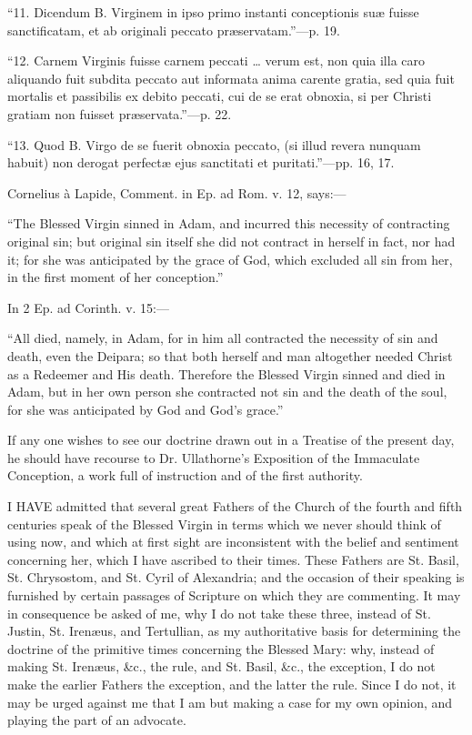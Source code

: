 ``11. Dicendum B. Virginem in ipso primo instanti conceptionis
suæ fuisse sanctificatam, et ab originali peccato præservatam.''—p.
19.


``12. Carnem Virginis fuisse carnem peccati … verum est, non
quia illa caro aliquando fuit subdita peccato aut informata anima
carente gratia, sed quia fuit mortalis et passibilis ex debito peccati,
cui de se erat obnoxia, si per Christi gratiam non fuisset præservata.''—p.
22.


``13. Quod B. Virgo de se fuerit obnoxia peccato, (si illud
revera nunquam habuit) non derogat perfectæ ejus sanctitati et puritati.''—pp.
16, 17.

Cornelius à Lapide, Comment. in Ep. ad Rom. v. 12, says:—


``The Blessed Virgin sinned in Adam, and incurred this necessity
of contracting original sin; but original sin itself she did not
contract in herself in fact, nor had it; for she was anticipated by the
grace of God, which excluded all sin from her, in the first moment of
her conception.''


In 2 Ep. ad Corinth. v. 15:—


``All died, namely, in Adam, for in him all contracted the
necessity of sin and death, even the Deipara; so that both herself and
man altogether needed Christ as a Redeemer and His death. Therefore the
Blessed Virgin sinned and died in Adam, but in her own person she
contracted not sin and the death of the soul, for she was anticipated by
God and God's grace.''


If any one wishes to see our doctrine drawn out in a Treatise of the
present day, he should have recourse to Dr. Ullathorne's Exposition of
the Immaculate Conception, a work full of instruction and of the first
authority.









I HAVE admitted that several great Fathers of
the Church of the fourth and fifth centuries speak of the Blessed Virgin
in terms which we never should think of using now, and which at first
sight are inconsistent with the belief and sentiment concerning her,
which I have ascribed to their times. These Fathers are St. Basil, St.
Chrysostom, and St. Cyril of Alexandria; and the occasion of their
speaking is furnished by certain passages of Scripture on which they are
commenting. It may in consequence be asked of me, why I do not take
these three, instead of St. Justin, St. Irenæus, and Tertullian, as my
authoritative basis for determining the doctrine of the primitive times
concerning the Blessed Mary: why, instead of making St. Irenæus,
\&c., the rule, and St. Basil, \&c., the exception, I do not make
the earlier Fathers the exception, and the latter the rule. Since I do
not, it may be urged against me that I am but making a case for my own
opinion, and playing the part of an advocate.


